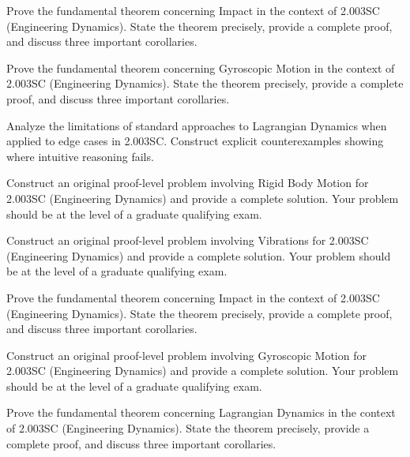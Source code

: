 \documentclass[12pt,a4paper]{exam}
\begin{document}
\begin{questions}
\vspace{0.3cm}

\question[2]
Prove the fundamental theorem concerning Impact in the context of 2.003SC (Engineering Dynamics). State the theorem precisely, provide a complete proof, and discuss three important corollaries.

\vspace{0.3cm}

\question[5]
Prove the fundamental theorem concerning Gyroscopic Motion in the context of 2.003SC (Engineering Dynamics). State the theorem precisely, provide a complete proof, and discuss three important corollaries.

\vspace{0.3cm}

\question[3]
Analyze the limitations of standard approaches to Lagrangian Dynamics when applied to edge cases in 2.003SC. Construct explicit counterexamples showing where intuitive reasoning fails.

\vspace{0.3cm}

\question[5]
Construct an original proof-level problem involving Rigid Body Motion for 2.003SC (Engineering Dynamics) and provide a complete solution. Your problem should be at the level of a graduate qualifying exam.

\vspace{0.3cm}

\question[4]
Construct an original proof-level problem involving Vibrations for 2.003SC (Engineering Dynamics) and provide a complete solution. Your problem should be at the level of a graduate qualifying exam.

\vspace{0.3cm}

\question[3]
Prove the fundamental theorem concerning Impact in the context of 2.003SC (Engineering Dynamics). State the theorem precisely, provide a complete proof, and discuss three important corollaries.

\vspace{0.3cm}

\question[6]
Construct an original proof-level problem involving Gyroscopic Motion for 2.003SC (Engineering Dynamics) and provide a complete solution. Your problem should be at the level of a graduate qualifying exam.

\vspace{0.3cm}

\question[4]
Prove the fundamental theorem concerning Lagrangian Dynamics in the context of 2.003SC (Engineering Dynamics). State the theorem precisely, provide a complete proof, and discuss three important corollaries.


\end{questions}
\end{document}
